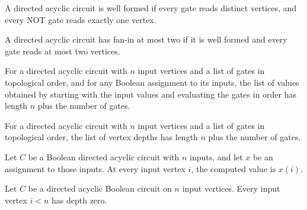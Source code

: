 \begin{definition}
\label{BoolCircuit.DAGCircuit.IsWellFormed}
\leanok
A directed acyclic circuit is well formed if every gate reads distinct vertices, and
every NOT gate reads exactly one vertex.
\end{definition}

\begin{definition}
\label{BoolCircuit.DAGCircuit.IsFaninTwo}
\leanok
{}
A directed acyclic circuit has fan-in at most two if it is well formed and every gate
reads at most two vertices.
\end{definition}

\begin{theorem}
\label{BoolCircuit.DAGCircuit.length_values}
\leanok
{}
For a directed acyclic circuit with $n$ input vertices and a list of gates in
topological order, and for any Boolean assignment to its inputs, the list of values
obtained by starting with the input values and evaluating the gates in order has length
$n$ plus the number of gates.
\end{theorem}

\begin{theorem}
\label{BoolCircuit.DAGCircuit.length_depths}
\leanok
{}
For a directed acyclic circuit with $n$ input vertices and a list of gates in
topological order, the list of vertex depths has length $n$ plus the number of gates.
\end{theorem}

\begin{theorem}
\label{BoolCircuit.DAGCircuit.values_getD_input}
\leanok
{}
Let $C$ be a Boolean directed acyclic circuit with $n$ inputs, and let $x$ be an
assignment to those inputs. At every input vertex $i$, the computed value is $x(i)$.
\end{theorem}

\begin{theorem}
\label{BoolCircuit.DAGCircuit.depthAt_input}
\leanok
{}
Let $C$ be a directed acyclic Boolean circuit on $n$ input vertices. Every input vertex
$i<n$ has depth zero.
\end{theorem}

